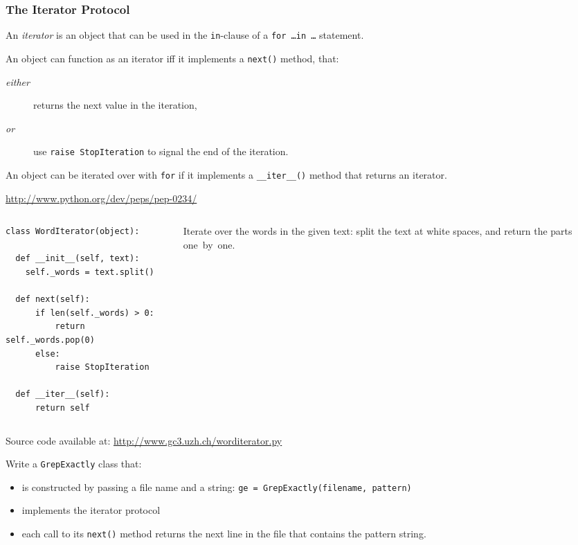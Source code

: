 \documentclass[english,serif,mathserif,xcolor=pdftex,dvipsnames,table]{beamer}
\begin{document}
\begin{frame}[fragile]
  \frametitle{The Iterator Protocol}

  An \emph{iterator} is an object that can be used in the
  \texttt{in}-clause of a \texttt{for \ldots in \ldots} statement.

  \+
  An object can function as an iterator iff it implements a
  \texttt{next()} method, that:
  \begin{description}
  \item[\emph{either}] returns the next value in the iteration,
  \item[\emph{or}] use \lstinline|raise StopIteration| to signal the
    end of the iteration.
  \end{description}

  \+
  An object can be iterated over with \lstinline|for| if it implements a
  \lstinline|__iter__()| method that returns an iterator.

  \begin{references}
    \url{http://www.python.org/dev/peps/pep-0234/}
  \end{references}
\end{frame}


\begin{frame}[fragile]
  \begin{columns}[t]
    \begin{column}{0.5\textwidth}
\begin{lstlisting}
class WordIterator(object):

  def __init__(self, text):
    self._words = text.split()

  def next(self):
      if len(self._words) > 0:
          return self._words.pop(0)
      else:
          raise StopIteration

  def __iter__(self):
      return self
\end{lstlisting}
    \end{column}
    \begin{column}{0.5\textwidth}
      \raggedleft
      Iterate over the words in the given text: split the text at
      white spaces, and return the parts one~by~one.
    \end{column}
  \end{columns}

  \+
  {\scriptsize Source code available at:
    \url{http://www.gc3.uzh.ch/worditerator.py}}
\end{frame}


\begin{frame}
  \begin{exercise}
    Write a \texttt{GrepExactly} class that:
    \begin{itemize}
    \item is constructed by passing a file name and a string: 
      \lstinline|ge = GrepExactly(filename, pattern)|
    \item implements the iterator protocol
    \item each call to its \texttt{next()} method returns the next line
      in the file that contains the pattern string.
    \end{itemize}

  \end{exercise}
\end{frame}
\end{document}
